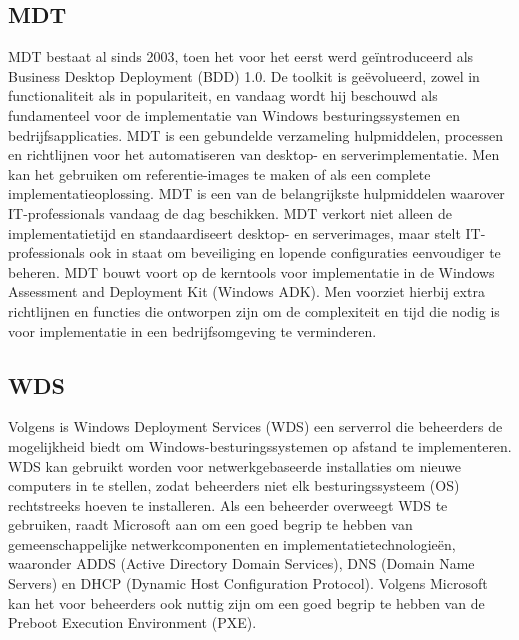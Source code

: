 \subsection{MDT}
MDT bestaat al sinds 2003, toen het voor het eerst werd geïntroduceerd als Business Desktop Deployment (BDD) 1.0. De toolkit is geëvolueerd, zowel in functionaliteit als in populariteit, en vandaag wordt hij beschouwd als fundamenteel voor de implementatie van Windows besturingssystemen en bedrijfsapplicaties.
\newline
MDT is een gebundelde verzameling hulpmiddelen, processen en richtlijnen voor het automatiseren van desktop- en serverimplementatie. Men kan het gebruiken om referentie-images te maken of als een complete implementatieoplossing. MDT is een van de belangrijkste hulpmiddelen waarover IT-professionals vandaag de dag beschikken. MDT verkort niet alleen de implementatietijd en standaardiseert desktop- en serverimages, maar stelt IT-professionals ook in staat om beveiliging en lopende configuraties eenvoudiger te beheren. MDT bouwt voort op de kerntools voor implementatie in de Windows Assessment and Deployment Kit (Windows ADK). Men voorziet hierbij extra richtlijnen en functies die ontworpen zijn om de complexiteit en tijd die nodig is voor implementatie in een bedrijfsomgeving te verminderen.\autocite{Microsoft2021}

\subsection{WDS}
Volgens \textcite{Boger2014} is Windows Deployment Services (WDS) een serverrol die beheerders de mogelijkheid biedt om Windows-besturingssystemen op afstand te implementeren. WDS kan gebruikt worden voor netwerkgebaseerde installaties om nieuwe computers in te stellen, zodat beheerders niet elk besturingssysteem (OS) rechtstreeks hoeven te installeren.
\newline
Als een beheerder overweegt WDS te gebruiken, raadt Microsoft aan om een goed begrip te hebben van gemeenschappelijke netwerkcomponenten en implementatietechnologieën, waaronder ADDS (Active Directory Domain Services), DNS (Domain Name Servers) en DHCP (Dynamic Host Configuration Protocol). Volgens Microsoft kan het voor beheerders ook nuttig zijn om een goed begrip te hebben van de Preboot Execution Environment (PXE).



